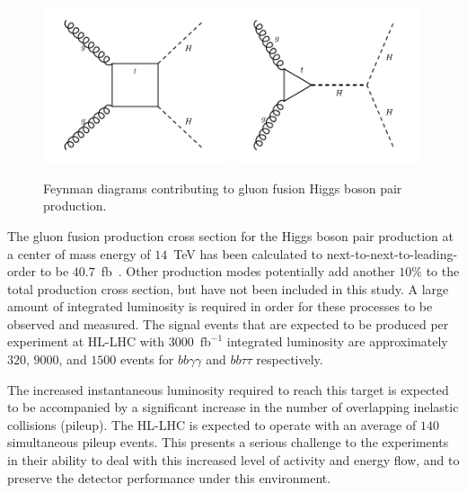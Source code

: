 \begin{figure}[hbtp]
  \begin{center}
    \includegraphics[width=0.49\textwidth]{figures_chapter6/hhbox.pdf}
    \includegraphics[width=0.49\textwidth]{figures_chapter6/hhself.pdf}       
    \caption{Feynman diagrams contributing to gluon fusion Higgs boson pair production.}
    \label{fig:feynman}
  \end{center}
\end{figure}

The gluon fusion production cross section for the Higgs boson pair production at a center of mass energy of $14$~TeV has been calculated to next-to-next-to-leading-order to be $40.7$~fb~\cite{Dawson:1998py,Grigo:2014jma}. Other production modes potentially add another $10\%$ to the total production cross section, but have not been included in this study. A large amount of integrated luminosity is required in order for these processes to be observed and measured. The signal events that are expected to be produced per experiment at HL-LHC with $3000$~$\mathrm{fb}^{-1}$ integrated luminosity are approximately $320$, $9000$, and $1500$ events for $bb\gamma\gamma$ and $bb\tau\tau$ respectively.

The increased instantaneous luminosity required to reach this target is expected to be accompanied by a significant increase in the number of overlapping inelastic collisions (pileup). The HL-LHC is expected to operate with an average of $140$ simultaneous pileup events. This presents a serious challenge to the experiments in their ability to deal with this increased level of activity and energy flow, and to preserve the detector performance under this environment. 

